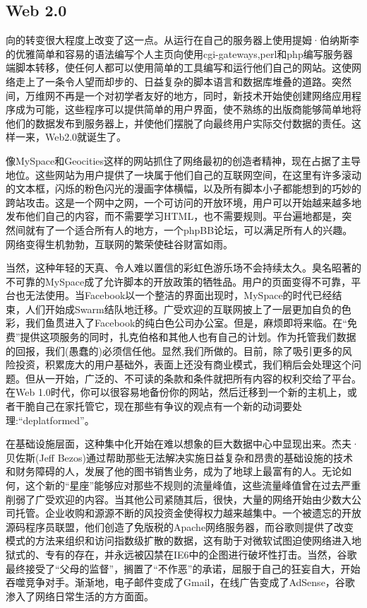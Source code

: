 \subsection{Web 2.0 \statusgreen}\label{sec:web_2}

向的转变很大程度上改变了这一点。从运行在自己的服务器上使用提姆·伯纳斯李的优雅简单和容易的语法编写个人主页向使用cgi-gateways,perl和php编写服务器端脚本转移，使任何人都可以使用简单的工具编写和运行他们自己的网站。这使网络走上了一条令人望而却步的、日益复杂的脚本语言和数据库堆叠的道路。突然间，万维网不再是一个对初学者友好的地方，同时，新技术开始使创建网络应用程序成为可能，这些程序可以提供简单的用户界面，使不熟练的出版商能够简单地将他们的数据发布到服务器上，并使他们摆脱了向最终用户实际交付数据的责任。这样一来，Web2.0就诞生了。

像MySpace和Geocities这样的网站抓住了网络最初的创造者精神，现在占据了主导地位。这些网站为用户提供了一块属于他们自己的互联网空间，在这里有许多滚动的文本框，闪烁的粉色闪光的漫画字体横幅，以及所有脚本小子都能想到的巧妙的跨站攻击。这是一个网中之网，一个可访问的开放环境，用户可以开始越来越多地发布他们自己的内容，而不需要学习HTML，也不需要规则。平台遍地都是，突然间就有了一个适合所有人的地方，一个phpBB论坛，可以满足所有人的兴趣。网络变得生机勃勃，互联网的繁荣使硅谷财富如雨。

当然，这种年轻的天真、令人难以置信的彩虹色游乐场不会持续太久。臭名昭著的不可靠的MySpace成了允许脚本的开放政策的牺牲品。用户的页面变得不可靠，平台也无法使用。当Facebook以一个整洁的界面出现时，MySpace的时代已经结束，人们开始成Swarm结队地迁移。广受欢迎的互联网披上了一层更加自负的色彩，我们鱼贯进入了Facebook的纯白色公司办公室。但是，麻烦即将来临。在“免费”提供这项服务的同时，扎克伯格和其他人也有自己的计划。作为托管我们数据的回报，我们(愚蠢的\cite{carlson2010ims})必须信任他。显然,我们所做的。目前，除了吸引更多的风险投资，积累庞大的用户基础外，表面上还没有商业模式，我们稍后会处理这个问题。但从一开始，广泛的、不可读的条款和条件就把所有内容的权利交给了平台。在Web 1.0时代，你可以很容易地备份你的网站，然后迁移到一个新的主机上，或者干脆自己在家托管它，现在那些有争议的观点有一个新的动词要处理:“deplatformed”。

在基础设施层面，这种集中化开始在难以想象的巨大数据中心中显现出来。杰夫·贝佐斯(Jeff Bezos)通过帮助那些无法解决实施日益复杂和昂贵的基础设施的技术和财务障碍的人，发展了他的图书销售业务，成为了地球上最富有的人。无论如何，这个新的“星座”能够应对那些不规则的流量峰值，这些流量峰值曾在过去严重削弱了广受欢迎的内容。当其他公司紧随其后，很快，大量的网络开始由少数大公司托管。企业收购和源源不断的风投资金使得权力越来越集中。一个被遗忘的开放源码程序员联盟，他们创造了免版税的Apache网络服务器，而谷歌则提供了改变模式的方法来组织和访问指数级扩散的数据，这有助于对微软试图迫使网络进入地狱式的、专有的存在，并永远被囚禁在IE6中的企图进行破坏性打击。当然，谷歌最终接受了“父母的监督”，搁置了“不作恶”的承诺，屈服于自己的狂妄自大，开始吞噬竞争对手。渐渐地，电子邮件变成了Gmail，在线广告变成了AdSense，谷歌渗入了网络日常生活的方方面面。

